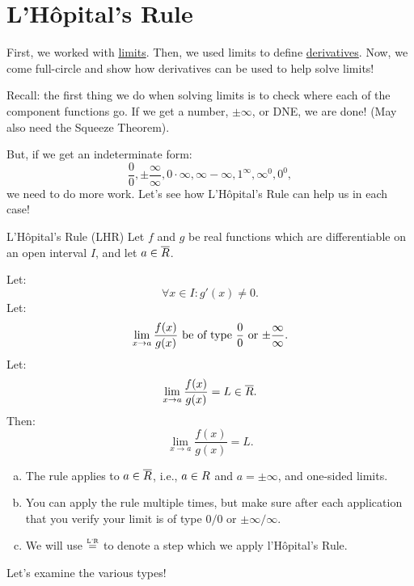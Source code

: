 \section{L'Hôpital's Rule}
First, we worked with \underline{limits}. Then, we used limits to define \underline{derivatives}. Now,
we come full-circle and show how derivatives can be used to help solve limits!

Recall: the first thing we do when solving limits is to check where each of the component functions go. If
we get a number, $ \pm \infty $, or DNE, we are done! (May also need the Squeeze Theorem).

But, if we get an indeterminate form:
\[ \frac{0}{0},\pm \frac{\infty}{\infty},0\cdot \infty,\infty-\infty,1^{\infty},\infty^0,0^0, \]
we need to do more work. Let's see how L'Hôpital's Rule can help us in each case!
\begin{Theorem}{L'Hôpital's Rule (LHR)}{}
    Let $ f $ and $ g $ be real functions which are differentiable on an open interval $ I $, and let $ a\in\overline{\relax{R}} $.

    Let:
    \[ \forall x\in I:g'(x)\ne 0. \]
    Let:
    \[ \lim\limits_{{x} \to {a}}\frac{f(x)}{g(x)}\text{ be of type $\frac{0}{0}$ or $ \pm \frac{\infty}{\infty} $}. \]
    Let:
    \[ \lim\limits_{{x} \to {a}}\frac{f(x)}{g(x)}=L\in\overline{\relax{R}}. \]
    Then:
    \[ \lim\limits_{{x} \to {a}}\frac{f(x)}{g(x)}=L. \]
\end{Theorem}
\begin{Remark}{}{}
    \begin{enumerate}[(a)]
        \item The rule applies to $ a\in\overline{\relax{R}} $, i.e., $ a\in\relax{R} $ and $ a=\pm\infty $, and one-sided limits.
        \item You can apply the rule multiple times, but make sure after each application that you verify your limit is of type $ 0/0 $
              or $ \pm\infty/\infty $.
        \item We will use $ \stackrel{\text{\tiny L'R}}{=} $ to denote a step which we apply l'Hôpital's Rule.
    \end{enumerate}
\end{Remark}
Let's examine the various types!
